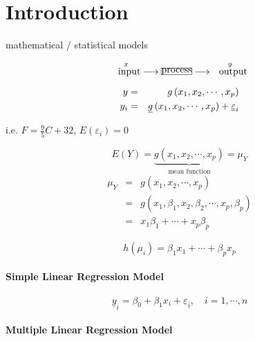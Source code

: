 \documentclass{article}
\begin{document}
\setcounter{part}{1} \setcounter{page}{1}

\section{Introduction}

mathematical / statistical models

\begin{equation*}
\overset{x}{\text{input}}\longrightarrow \frame{process}\longrightarrow 
\overset{y}{\text{output}}
\end{equation*}

\begin{eqnarray*}
y &=&g\left( x_{1},x_{2},\cdots ,x_{p}\right) \\
y_{i} &=&\underline{g}\left( x_{1},x_{2},\cdots ,x_{p}\right) +\underline{%
\varepsilon }_{i}
\end{eqnarray*}

i.e. $F=\frac{9}{5}C+32$, $E\left( \varepsilon _{i}\right) =0$

\bigskip

\begin{equation*}
E\left( Y\right) =\underset{\text{mean function}}{\underbrace{g\left(
x_{1},x_{2},\cdots ,x_{p}\right) }}=\mu _{Y}
\end{equation*}%
\begin{eqnarray*}
\mu _{Y} &=&g\left( x_{1},x_{2},\cdots ,x_{p}\right) \\
&=&g\left( x_{1},\beta _{1},x_{2},\beta _{2},\cdots ,x_{p},\beta _{p}\right)
\\
&=&x_{1}\beta _{1}+\cdots +x_{p}\beta _{p}
\end{eqnarray*}

\begin{equation*}
h\left( \mu _{i}\right) =\beta _{1}x_{1}+\cdots +\beta _{p}x_{p}
\end{equation*}

\bigskip

\paragraph{Simple Linear Regression Model}

\begin{equation*}
\underline{y}_{i}=\beta _{0}+\beta _{1}x_{i}+\underline{\varepsilon }%
_{i},\quad i=1,\cdots ,n
\end{equation*}

\paragraph{Multiple Linear Regression Model}
\end{document}
